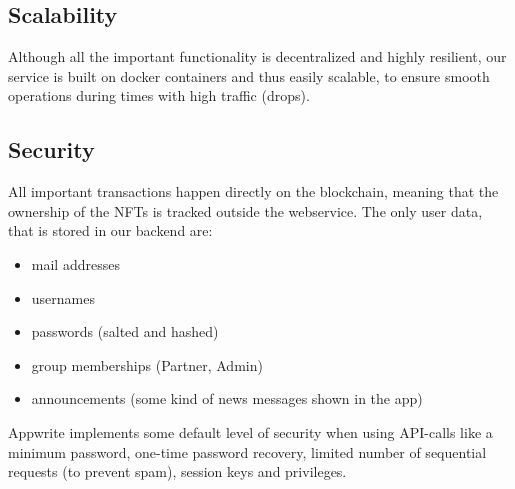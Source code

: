 \documentclass[
]{article}
\providecommand{\tightlist}{%
  \setlength{\itemsep}{0pt}\setlength{\parskip}{0pt}}
\begin{document}
\hypertarget{scalability}{%
\subsection{Scalability}\label{scalability}}

Although all the important functionality is decentralized and highly
resilient, our service is built on docker containers and thus easily
scalable, to ensure smooth operations during times with high traffic
(drops).

\hypertarget{security}{%
\subsection{Security}\label{security}}

All important transactions happen directly on the blockchain, meaning
that the ownership of the NFTs is tracked outside the webservice. The
only user data, that is stored in our backend are:

\begin{itemize}
\tightlist
\item
  mail addresses
\item
  usernames
\item
  passwords (salted and hashed)
\item
  group memberships (Partner, Admin)
\item
  announcements (some kind of news messages shown in the app)
\end{itemize}

Appwrite implements some default level of security when using API-calls
like a minimum password, one-time password recovery, limited number of
sequential requests (to prevent spam), session keys and privileges.
\end{document}
